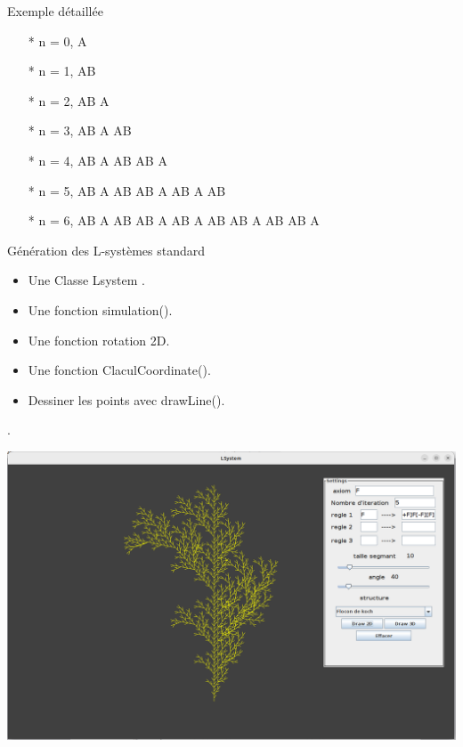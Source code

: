 \begin{frame}{Exemple détaillée}
    \begin{enumerate}
	       \item[*] n = 0, A
        \item[*] n = 1, AB
     \item[*] n = 2, AB A
     \item[*] n = 3, AB A AB
    \item[*] n = 4, AB A AB AB A
     \item[*]n = 5, AB A AB AB A AB A AB
     \item[*]n = 6, AB A AB AB A AB A AB AB A AB AB A
	   \end{enumerate} 
\end{frame}

\begin{frame}{Génération des L-systèmes standard }
       \begin{itemize}
        
           \item  Une Classe Lsystem .
           \item Une fonction simulation().
           \item Une fonction rotation 2D.
           \item  Une fonction ClaculCoordinate().
           \item Dessiner les points avec drawLine().
       \end{itemize}.
  
\end{frame}

\begin{frame}{}
    \begin{center}
        \includegraphics[scale=0.3]{./images/capture3.png}
    \end{center}
\end{frame}

